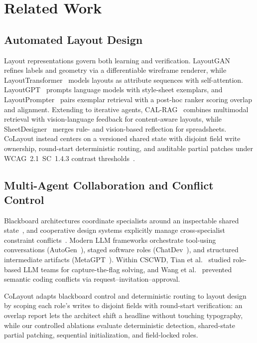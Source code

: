\section{Related Work}
\label{sec:related}

\subsection{Automated Layout Design}
Layout representations govern both learning and verification.
LayoutGAN~\cite{li2019layoutgan} refines labels and geometry via a
differentiable wireframe renderer, while
LayoutTransformer~\cite{gupta2021layouttransformer} models layouts as attribute
sequences with self-attention. LayoutGPT~\cite{feng2023layoutgpt} prompts
language models with style-sheet exemplars, and
LayoutPrompter~\cite{lin2023layoutprompter} pairs exemplar retrieval with a
post-hoc ranker scoring overlap and alignment. Extending to iterative agents,
CAL-RAG~\cite{forouzandehmehr2025calrag} combines multimodal retrieval with
vision-language feedback for content-aware layouts, while
SheetDesigner~\cite{chen2025sheetdesigner} merges rule- and vision-based
reflection for spreadsheets. CoLayout instead centers on a versioned shared
state with disjoint field write ownership, round-start deterministic routing,
and auditable partial patches under WCAG~2.1~SC~1.4.3 contrast
thresholds~\cite{wcag21}.

\subsection{Multi-Agent Collaboration and Conflict Control}
Blackboard architectures coordinate specialists around an inspectable shared
state~\cite{hayesroth1985blackboard}, and cooperative design systems explicitly
manage cross-specialist constraint conflicts~\cite{klein1991conflict}. Modern
LLM frameworks orchestrate tool-using conversations
(AutoGen~\cite{wu2024autogen}), staged software roles
(ChatDev~\cite{qian2024chatdev}), and structured intermediate artifacts
(MetaGPT~\cite{hong2024metagpt}). Within CSCWD, Tian et
al.~\cite{tian2026rolellm} studied role-based LLM teams for capture-the-flag
solving, and Wang et al.~\cite{wang2024conflict} prevented semantic coding
conflicts via request--invitation--approval.

CoLayout adapts blackboard control and deterministic routing to layout design
by scoping each role's writes to disjoint fields with round-start verification:
an overlap report lets the architect shift a headline without touching
typography, while our controlled ablations evaluate deterministic detection,
shared-state partial patching, sequential initialization, and field-locked
roles.
